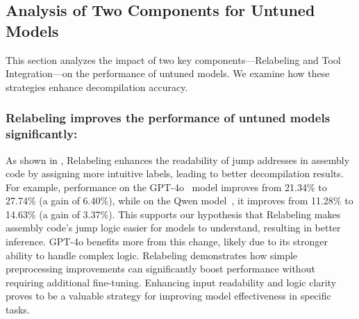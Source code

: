 \subsection{Analysis of Two Components for Untuned Models}

This section analyzes the impact of two key components—Relabeling and Tool Integration—on the performance of untuned models. We examine how these strategies enhance decompilation accuracy.





\subsubsection{Relabeling improves the performance of untuned models significantly:}
As shown in , Relabeling enhances the readability of jump addresses in assembly code by assigning more intuitive labels, leading to better decompilation results.
For example, performance on the GPT-4o~\citep{gpt4} model improves from 21.34\% to 27.74\% (a gain of 6.40\%), while on the Qwen model~\citep{qwen2.5coder}, it improves from 11.28\% to 14.63\% (a gain of 3.37\%).
This supports our hypothesis that Relabeling makes assembly code’s jump logic easier for models to understand, resulting in better inference. GPT-4o benefits more from this change, likely due to its stronger ability to handle complex logic.
Relabeling demonstrates how simple preprocessing improvements can significantly boost performance without requiring additional fine-tuning. 
Enhancing input readability and logic clarity proves to be a valuable strategy for improving model effectiveness in specific tasks.

